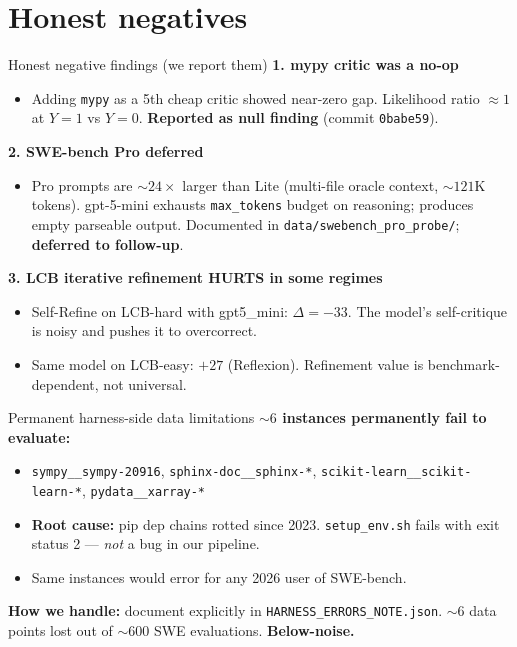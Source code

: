 \documentclass[10pt]{beamer}
\newcommand{\good}[1]{\textcolor{accentGreen}{\textbf{#1}}}
\newcommand{\bad}[1]{\textcolor{accentRed}{\textbf{#1}}}
\newcommand{\warn}[1]{\textcolor{accentOrange}{\textbf{#1}}}
\begin{document}

\section{Honest negatives}
\hypertarget{out:13}{}

\begin{frame}{Honest negative findings (we report them)}
\vspace{0.2cm}
\textcolor{accentRed}{\textbf{1. mypy critic was a no-op}}
\begin{itemize}
\item Adding \texttt{mypy} as a 5th cheap critic showed near-zero gap.
  Likelihood ratio $\approx 1$ at $Y{=}1$ vs $Y{=}0$. \warn{Reported as null
  finding} (commit \texttt{0babe59}).
\end{itemize}
\textcolor{accentRed}{\textbf{2. SWE-bench Pro deferred}}
\begin{itemize}
\item Pro prompts are ${\sim}24\times$ larger than Lite (multi-file oracle
  context, ${\sim}121$K tokens). gpt-5-mini exhausts \texttt{max\_tokens}
  budget on reasoning; produces empty parseable output. Documented in
  \texttt{data/swebench\_pro\_probe/}; \warn{deferred to follow-up}.
\end{itemize}
\textcolor{accentRed}{\textbf{3. LCB iterative refinement HURTS in some regimes}}
\begin{itemize}
\item Self-Refine on LCB-hard with gpt5\_mini: \bad{$\Delta = -33$}. The
  model's self-critique is noisy and pushes it to overcorrect.
\item Same model on LCB-easy: \good{$+27$} (Reflexion). Refinement value is
  benchmark-dependent, not universal.
\end{itemize}
\end{frame}

\begin{frame}{Permanent harness-side data limitations}
\vspace{0.3cm}
\warn{${\sim}6$ instances permanently fail to evaluate:}
\begin{itemize}
\item \texttt{sympy\_\_sympy-20916}, \texttt{sphinx-doc\_\_sphinx-*},
  \texttt{scikit-learn\_\_scikit-learn-*}, \texttt{pydata\_\_xarray-*}
\item \bad{Root cause:} pip dep chains rotted since 2023. \texttt{setup\_env.sh}
  fails with exit status 2 --- \emph{not} a bug in our pipeline.
\item Same instances would error for any 2026 user of SWE-bench.
\end{itemize}

\good{How we handle:} document explicitly in \texttt{HARNESS\_ERRORS\_NOTE.json}.
${\sim}6$ data points lost out of ${\sim}600$ SWE evaluations. \good{Below-noise.}
\end{frame}
\end{document}

